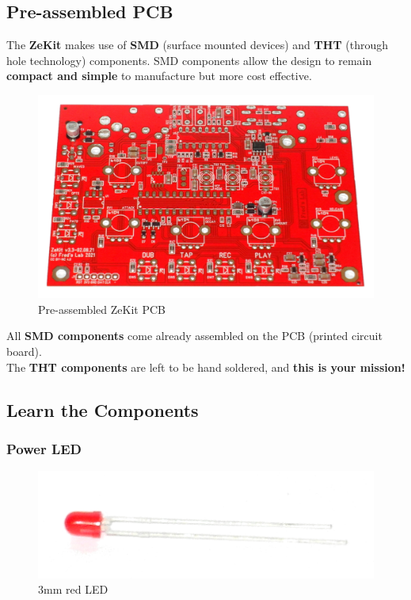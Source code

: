 \documentclass{scrartcl}
\begin{document}
\pagebreak
\subsection{Pre-assembled PCB}

The \textbf{ZeKit} makes use of \textbf{SMD} (surface mounted devices) and \textbf{THT} (through hole technology) components. SMD components allow the design to remain \textbf{compact and simple} to manufacture but more cost effective.

\begin{figure}[!ht]
    \begin{center}
        \includegraphics[scale=0.10]{assets/zekit-unassembled.jpg}
        \caption{Pre-assembled ZeKit PCB}
    \end{center}
\end{figure}

All \textbf{SMD components} come already assembled on the PCB (printed circuit board). \\
The \textbf{THT components} are left to be hand soldered, and \textbf{this is your mission!}

\subsection{Learn the Components}

\subsubsection{Power LED}

\begin{figure}[!ht]
    \begin{center}
        \includegraphics[scale=0.15]{assets/zekit-led.jpg}
        \caption{3mm red LED}
    \end{center}
\end{figure}
\end{document}
